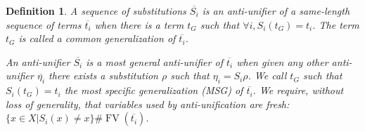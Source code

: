 \documentclass{article}
\newcommand{\tmem}[1]{{\em #1\/}}
\newcommand{\tmop}[1]{\ensuremath{\operatorname{#1}}}
\newtheorem{definition}{Definition}
{\theorembodyfont{\rmfamily}\newtheorem{example}{Example}}
\begin{document}
\begin{definition}
  A sequence of substitutions $\overline{S_i}$ is an {\tmem{anti-unifier}} of
  a same-length sequence of terms $\overline{t_i}$ when there is a term $t_G$
  such that $\forall i, S_i (t_G) = t_i$. The term $t_G$ is called a
  {\tmem{common generalization}} of $\overline{t_i}$.
  
  An anti-unifier $\overline{S_i}$ is a {\tmem{most general anti-unifier}} of
  $\overline{t_i}$ when given any other anti-unifier $\overline{\eta_i}$ there
  exists a substitution $\rho$ such that $\eta_i = S_i \rho$. We call $t_G$
  such that $S_i (t_G) = t_i$ the {\tmem{most specific generalization}} (MSG)
  of $\overline{t_i}$. We require, without loss of generality, that variables
  used by anti-unification are fresh: $\{ x \in X | S_i (x) \neq x \} \#
  \tmop{FV} (\overline{t_i})$.
\end{definition}
\end{document}
